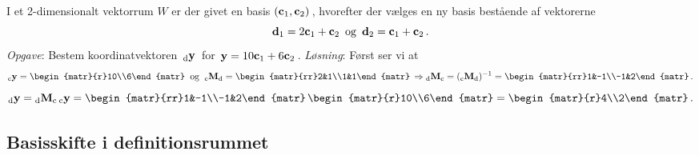 \begin{example}\label{tn8.exAbildM2}
I et 2-dimensionalt vektorrum $W$ er der givet en basis $(\mathbf{c}_1,\mathbf{c}_2)\,$, hvorefter der vælges en ny basis bestående af vektorerne $$\mathbf{d}_1=2\mathbf{c}_1+\mathbf{c}_2\,\,\,\mathrm{og}\,\,\,\mathbf{d}_2=\mathbf{c}_1+\mathbf{c}_2\,.$$
\textit{Opgave}: Bestem koordinatvektoren $\,{_\mathrm{d}\mathbf{y}}\,$ for $\,\mathbf y=10\mathbf{c}_1+6\mathbf{c}_2\,$.\bs
\textit{Løsning}: Først ser vi at
\begin{equation}\label{tn8.exAbildM2.1}
\vekind cy = \begin{matr}{r}10\\6\end{matr}\mathrm{\;\;og\;\;}
\matind cMd=\begin{matr}{rr}2&1\\1&1\end{matr}\,
\Rightarrow
\matind dMc=(\matind cMd)^{\mathrm{-}1}=\begin{matr}{rr}1&-1\\-1&2\end{matr}\,.
\end{equation}
\begin{equation}\label{tn8.exAbildM2.2}
\vekind dy =\matind dMc \,\vekind cy = 
\begin{matr}{rr}1&-1\\-1&2\end{matr}\,  
\begin{matr}{r}10\\6\end{matr}=\begin{matr}{r}4\\2\end{matr}\,.
\end{equation}
\end{example}

\subsection{Basisskifte i definitionsrummet}

